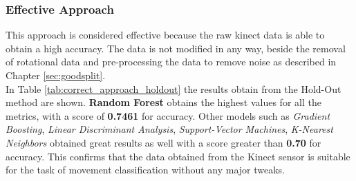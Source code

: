             \subsubsection{Effective Approach}
                This approach is considered effective because the raw kinect data is able to obtain a high accuracy. The data is not modified in any way, beside the removal of rotational data and pre-processing the data to remove noise as described in Chapter \ref{sec:goodsplit}.\\
                 
                In Table \ref{tab:correct_approach_holdout} the results obtain from the Hold-Out method are shown. \textbf{Random Forest} obtains the highest values for all the metrics, with a score of \textbf{0.7461} for accuracy. Other models such as \textit{Gradient Boosting}, \textit{Linear Discriminant Analysis}, \textit{Support-Vector Machines}, \textit{K-Nearest Neighbors} obtained great results as well with a score greater than \textbf{0.70} for accuracy. This confirms that the data obtained from the Kinect sensor is suitable for the task of movement classification without any major tweaks.\\
                
